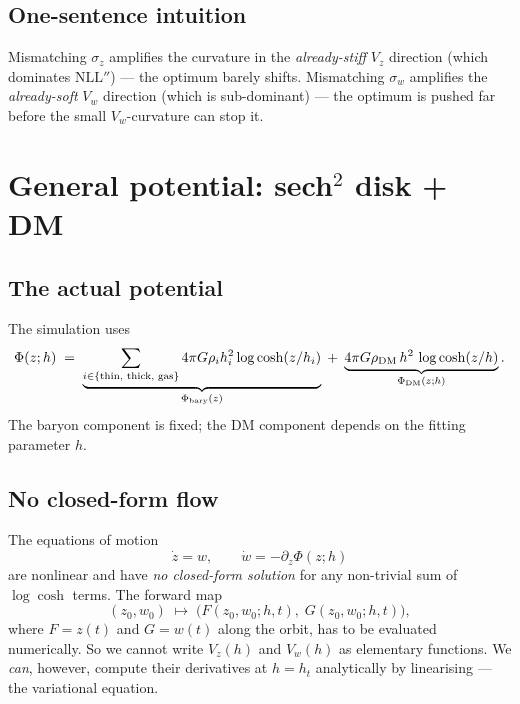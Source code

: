 \documentclass[11pt]{article}
\begin{document}
\subsection{One-sentence intuition}

Mismatching $\sigma_z$ amplifies the curvature in the \emph{already-stiff} $V_z$
direction (which dominates $\mathrm{NLL}''$) — the optimum barely shifts. Mismatching
$\sigma_w$ amplifies the \emph{already-soft} $V_w$ direction (which is sub-dominant) —
the optimum is pushed far before the small $V_w$-curvature can stop it.

\section{General potential: sech$^2$ disk + DM}

\subsection{The actual potential}

The simulation uses
\begin{equation}
\Phi(z;h) \;=\; \underbrace{\sum_{i\in\{\text{thin, thick, gas}\}} 4\pi G\rho_i h_i^2 \log\cosh(z/h_i)}_{\Phi_{\rm bary}(z)}
\;+\; \underbrace{4\pi G\rho_{\rm DM}\,h^2\,\log\cosh(z/h)}_{\Phi_{\rm DM}(z;h)}.
\label{eq:realphi}
\end{equation}
The baryon component is fixed; the DM component depends on the fitting parameter $h$.

\subsection{No closed-form flow}

The equations of motion
\begin{equation}
\dot z = w,\qquad \dot w = -\partial_z\Phi(z;h)
\label{eq:eom-real}
\end{equation}
are nonlinear and have \emph{no closed-form solution} for any non-trivial sum of
$\log\cosh$ terms. The forward map
\begin{equation}
(z_0,w_0)\;\longmapsto\;\big(F(z_0,w_0;h,t),\;G(z_0,w_0;h,t)\big),
\end{equation}
where $F=z(t)$ and $G=w(t)$ along the orbit, has to be evaluated numerically. So we
cannot write $V_z(h)$ and $V_w(h)$ as elementary functions. We \emph{can}, however,
compute their derivatives at $h=h_t$ analytically by linearising — the variational
equation.
\end{document}
